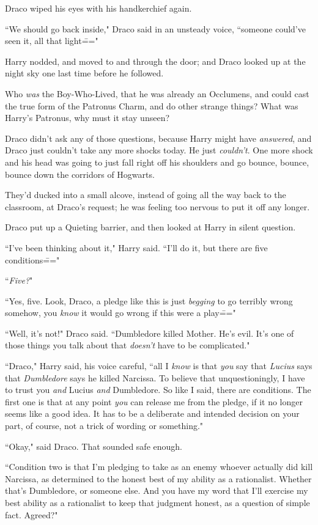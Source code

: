 Draco wiped his eyes with his handkerchief again.

``We should go back inside," Draco said in an unsteady voice, ``someone could've seen it, all that light\==="

Harry nodded, and moved to and through the door; and Draco looked up at the night sky one last time before he followed.

Who \emph{was} the Boy-Who-Lived, that he was already an Occlumens, and could cast the true form of the Patronus Charm, and do other strange things? What was Harry's Patronus, why must it stay unseen?

Draco didn't ask any of those questions, because Harry might have \emph{answered}, and Draco just couldn't take any more shocks today. He just \emph{couldn't}. One more shock and his head was going to just fall right off his shoulders and go bounce, bounce, bounce down the corridors of Hogwarts.

\later

They'd ducked into a small alcove, instead of going all the way back to the classroom, at Draco's request; he was feeling too nervous to put it off any longer.

Draco put up a Quieting barrier, and then looked at Harry in silent question.

``I've been thinking about it," Harry said. ``I'll do it, but there are five conditions\==="

``\emph{Five?}"

``Yes, five. Look, Draco, a pledge like this is just \emph{begging} to go terribly wrong somehow, you \emph{know} it would go wrong if this were a play\==="

``Well, it's not!" Draco said. ``Dumbledore killed Mother. He's evil. It's one of those things you talk about that \emph{doesn't} have to be complicated."

``Draco," Harry said, his voice careful, ``all I \emph{know} is that \emph{you} say that \emph{Lucius} says that \emph{Dumbledore} says he killed Narcissa. To believe that unquestioningly, I have to trust you \emph{and} Lucius \emph{and} Dumbledore. So like I said, there are conditions. The first one is that at any point \emph{you} can release me from the pledge, if it no longer seems like a good idea. It has to be a deliberate and intended decision on your part, of course, not a trick of wording or something."

``Okay," said Draco. That sounded safe enough.

``Condition two is that I'm pledging to take as an enemy whoever actually did kill Narcissa, as determined to the honest best of my ability as a rationalist. Whether that's Dumbledore, or someone else. And you have my word that I'll exercise my best ability as a rationalist to keep that judgment honest, as a question of simple fact. Agreed?"

